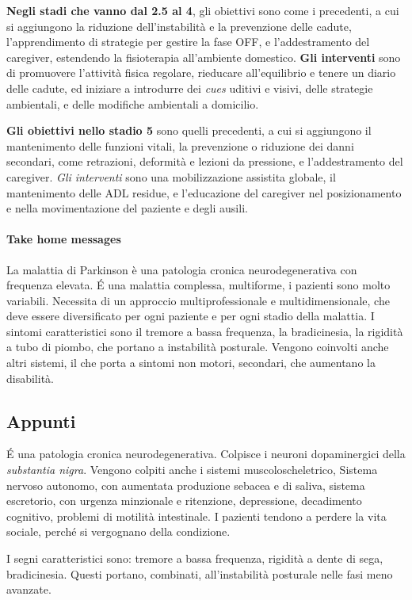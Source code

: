 \textbf{Negli stadi che vanno dal 2.5 al 4}, gli obiettivi sono come i
precedenti, a cui si aggiungono la riduzione dell'instabilità e la prevenzione
delle cadute, l'apprendimento di strategie per gestire la fase OFF, e
l'addestramento del caregiver, estendendo la fisioterapia all'ambiente
domestico. \textbf{Gli interventi} sono di promuovere l'attività fisica
regolare, rieducare all'equilibrio e tenere un diario delle cadute, ed iniziare
a introdurre dei \textit{cues} uditivi e visivi, delle strategie ambientali, e 
delle modifiche ambientali a domicilio.

\textbf{Gli obiettivi nello stadio 5} sono quelli precedenti, a cui si
aggiungono il mantenimento delle funzioni vitali, la prevenzione o riduzione
dei danni secondari, come retrazioni, deformità e lezioni da pressione, e
l'addestramento del caregiver. \textit{Gli interventi} sono una mobilizzazione
assistita globale, il mantenimento delle ADL residue, e l'educazione del
caregiver nel posizionamento e nella movimentazione del paziente e degli ausili.

\paragraph{Take home messages}
La malattia di Parkinson è una patologia cronica neurodegenerativa con frequenza
elevata. \'E una malattia complessa, multiforme, i pazienti sono molto
variabili. Necessita di un approccio multiprofessionale e multidimensionale,
che deve essere diversificato per ogni paziente e per ogni stadio della malattia.
I sintomi caratteristici sono il tremore a bassa frequenza, la bradicinesia, la
rigidità a tubo di piombo, che portano a instabilità posturale.
Vengono coinvolti anche altri sistemi, il che porta a sintomi non motori,
secondari, che aumentano la disabilità.

\subsection{Appunti}
\'E una patologia cronica neurodegenerativa. Colpisce i neuroni dopaminergici 
della \textit{substantia nigra}. Vengono colpiti anche i sistemi 
muscoloscheletrico, Sistema nervoso autonomo, con aumentata produzione sebacea 
e di saliva, sistema escretorio, con urgenza minzionale e ritenzione, 
depressione, decadimento cognitivo, problemi di motilità intestinale. I 
pazienti tendono a perdere la vita sociale, perché si vergognano della
condizione.

I segni caratteristici sono: tremore a bassa frequenza, rigidità a dente di 
sega, bradicinesia. Questi portano, combinati, all'instabilità posturale nelle 
fasi meno avanzate.

